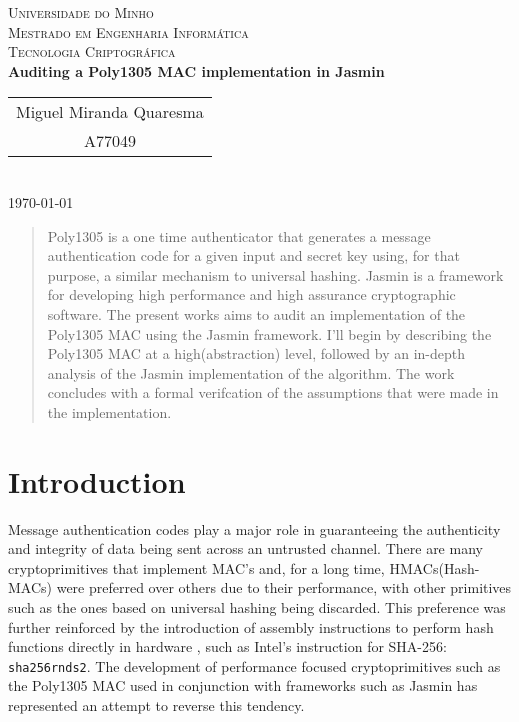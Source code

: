 \documentclass{article}
\begin{document}
{    
    \center
    \textsc{\Large Universidade do Minho} \\ [0.5cm]
    \textsc{\Large Mestrado em Engenharia Informática} \\ [0.5cm]
    \textsc{\large Tecnologia Criptográfica} \\ [0.5cm]
    
    {\LARGE \bfseries Auditing a Poly1305 MAC implementation in Jasmin} \\ [0.5cm]

    \begin{tabular}{c}
        Miguel Miranda Quaresma \\
        A77049 \\
    \end{tabular} \\ [0.5cm]

    \today \\ [1cm]
}

\begin{abstract}
    Poly1305 is a one time authenticator that generates a message authentication code for a given input and secret key using, for that purpose, a similar mechanism to
    universal hashing. Jasmin is a framework for developing high performance and high assurance cryptographic software. The present works aims to audit an implementation 
    of the Poly1305 MAC using the Jasmin framework. I'll begin by describing the Poly1305 MAC at a high(abstraction) level, followed by an in-depth analysis of the Jasmin 
    implementation of the algorithm. The work concludes with a formal verifcation of the assumptions that were made in the implementation.
\end{abstract}

\section{Introduction}
Message authentication codes play a major role in guaranteeing the authenticity and integrity of data being sent across an untrusted channel. There are many 
cryptoprimitives that implement MAC's and, for a long time, HMACs(Hash-MACs) were preferred over others due to their performance, with other primitives such 
as the ones based on universal hashing being discarded. This preference was further reinforced by the introduction of assembly instructions to perform hash 
functions directly in hardware \cite{sha_extensions}, such as Intel's instruction for SHA-256: \texttt{sha256rnds2}. The development of performance focused 
cryptoprimitives such as the Poly1305 MAC used in conjunction with frameworks such as Jasmin \cite{jasmin_paper} has represented an attempt to reverse this
tendency. 
\end{document}
